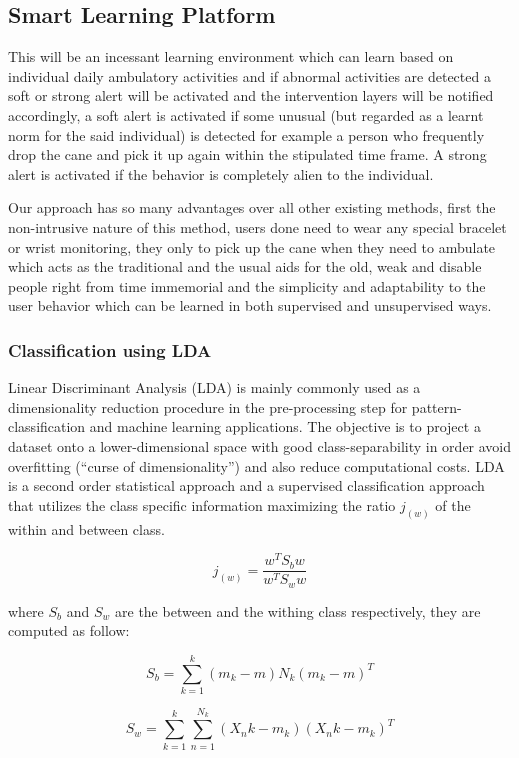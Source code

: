 \documentclass[a4paper, parskip=full]{scrartcl}
\begin{document}
\subsection*{Smart Learning Platform}

This will be an incessant learning environment which can learn based on individual daily ambulatory activities and if abnormal activities are detected a soft or strong alert will be activated and the intervention layers will be notified accordingly, a soft alert is activated if some unusual (but regarded as a learnt norm for the said individual) is detected for example a person who frequently drop the cane and pick it up again within the stipulated time frame. A strong alert is activated if the behavior is completely alien to the individual.

Our approach has so many advantages over all other existing methods, first the non-intrusive nature of this method, users done need to wear any special bracelet or wrist monitoring, they only to pick up the cane when they need to ambulate which acts as the traditional and the usual aids for the old, weak and disable people right from time immemorial and the simplicity and adaptability to the user behavior which can be learned in both supervised and unsupervised ways.

\subsubsection*{Classification using LDA}

Linear Discriminant Analysis (LDA) is mainly commonly used as a dimensionality reduction procedure in the pre-processing step for pattern-classification and machine learning applications. The objective is to project a dataset onto a lower-dimensional space with good class-separability in order avoid overfitting (“curse of dimensionality”) and also reduce computational costs. LDA is a second order statistical approach and a supervised classification approach that utilizes the class specific information maximizing the ratio $j_{(w)}$ of the within and between class.

\[j_{(w)} =\dfrac{w^TS_b w}{w^T S_w w}\]

where $S_b$ and  $S_w$ are the between and the withing class respectively, they are computed as follow:

\[S_b = \sum_{k =1}^{k} (m_k - m)N_k(m_k - m)^T\]

\[S_w = \sum_{k =1}^{k} \sum_{n =1}^{N_k}(X_nk - m_k)(X_nk - m_k)^T\]
\end{document}
